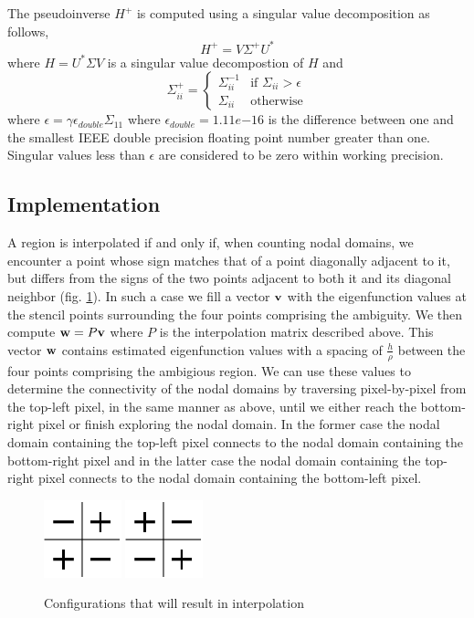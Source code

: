 \documentclass{report}
\begin{document}
The pseudoinverse $H^{+}$ is computed using a singular value decomposition as follows,
\[
H^{+} = V \Sigma^{+} U^{*}
\]
where $H = U^{*} \Sigma V$ is a singular value decompostion of $H$ and
\[
\Sigma^{+}_{ii} =\begin{cases}
\Sigma_{ii}^{-1} & \text{if }\Sigma_{ii} > \epsilon\\
\Sigma_{ii} & \text{otherwise}
\end{cases}
\]
where $\epsilon = \gamma \epsilon_{double} \Sigma_{11}$ where $\epsilon_{double} = 1.11e{-16}$ is the difference between one and the smallest IEEE double precision floating point number greater than one. Singular values less than $\epsilon$ are considered to be zero within working precision.

\subsection{Implementation}
A region is interpolated if and only if, when counting nodal domains, we encounter a point whose sign matches that of a point diagonally adjacent to it, but differs from the signs of the two points adjacent to both it and its diagonal neighbor (fig. \ref{fig:trouble_spot}). In such a case we fill a vector ${\bf v}$ with the eigenfunction values at the stencil points surrounding the four points comprising the ambiguity. We then compute ${\bf w} = P {\bf v}$ where $P$ is the interpolation matrix described above. This vector ${\bf w}$ contains estimated eigenfunction values with a spacing of $\frac{h}{\rho}$ between the four points comprising the ambigious region. We can use these values to determine the connectivity of the nodal domains by traversing pixel-by-pixel from the top-left pixel, in the same manner as above, until we either reach the bottom-right pixel or finish exploring the nodal domain. In the former case the nodal domain containing the top-left pixel connects to the nodal domain containing the bottom-right pixel and in the latter case the nodal domain containing the top-right pixel connects to the nodal domain containing the bottom-left pixel.

\begin{figure}
  \begin{center}
    \includegraphics[width=0.2\textwidth]{figs/interpolation/trouble_spot1.eps}
    \hspace{1 cm} 
    \includegraphics[width=0.2\textwidth]{figs/interpolation/trouble_spot2.eps}
    \caption{Configurations that will result in interpolation}
    \label{fig:trouble_spot}
  \end{center}
\end{figure}
\end{document}
